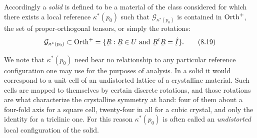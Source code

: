 Accordingly a \emph{solid} is defined to be a material of the class
considered for which there exists a local reference $\kappa^{*}(p_{0})$
such that $\mathcal{G}_{\kappa^{*}(p_{0})}$ is contained in
$\operatorname{Orth}^{+}$, the set of proper-orthogonal tensors, or simply the
rotations:
\begin{equation}
   \mathcal{G}_{\kappa^{*}(p_{0})}\subset\Orth^{+}
   =\{\bR:\bR\in U\ \text{and}\ \bR^{t}\bR=\hI\}.
   \tag{8.19}\label{eq:8.19}
\end{equation}

We note that $\kappa^{*}(p_{0})$ need bear no relationship to any
particular reference configuration one may use for the purposes of
analysis. In a solid it would correspond to a unit cell of an undistorted
lattice of a crystalline material. Such cells are mapped to themselves
by certain discrete rotations, and those rotations are what characterize
the crystalline symmetry at hand: four of them about a four-fold axis
for a square cell, twenty-four in all for a cubic crystal, and only the
identity for a triclinic one. For this reason $\kappa^{*}(p_{0})$ is
often called an \emph{undistorted} local configuration of the solid.

